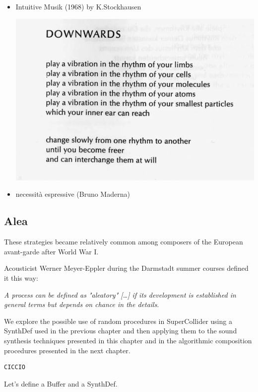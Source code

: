 \begin{enumerate}
\begin{itemize}
  \item Intuitive Musik (1968) by K.Stockhausen
    \begin{center}
    \includegraphics[scale=0.4]{../img/intu.png}
    \end{center}
  \item necessità espressive (Bruno Maderna)
  \end{itemize}
\end{enumerate}


\subsection{Alea}\label{alea}

These strategies became relatively common among composers of the European avant-garde after World War I.

Acousticist Werner Meyer-Eppler during the Darmstadt summer courses defined it this way:

\textit{A process can be defined as "aleatory" {[}\ldots{]} if its development
is established in general terms but depends on chance in the details}.

We explore the possible use of random procedures in SuperCollider using a SynthDef used in the previous chapter and then applying them to the sound synthesis techniques presented in this chapter and in the algorithmic composition procedures presented in the next chapter.

\begin{lstlisting}[frame=single] 
CICCIO
\end{lstlisting}

Let's define a Buffer and a SynthDef.

